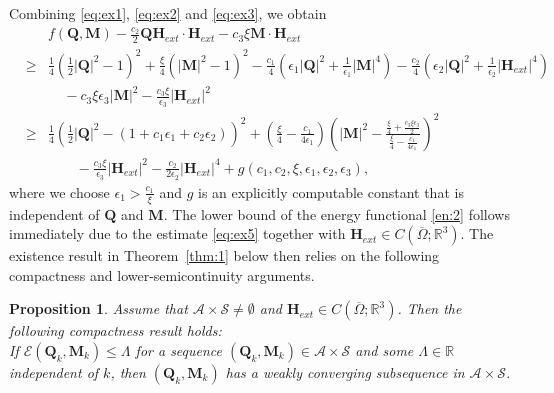 \documentclass{article}
\newtheorem{proposition}[theorem]{Proposition}
\def\Qvec{\mathbf{Q}}
\def \Mvec{\mathbf{M}}
\def\Hvec{\mathbf{H}}
\begin{document}
Combining \eqref{eq:ex1}, \eqref{eq:ex2} and \eqref{eq:ex3}, we obtain 
\begin{eqnarray}
& &f\left(\Qvec, \Mvec\right)-\frac{c_2}{2}\Qvec\Hvec_{ext}\cdot\Hvec_{ext}-c_3\xi\Mvec\cdot\Hvec_{ext}\nonumber\\
&\ge& \frac{1}{4}\left(\frac{1}{2}|\Qvec|^2 - 1\right)^2 + \frac{\xi}{4}\left(|\Mvec|^2 - 1\right)^2 -\frac{c_1}{4}\left(\epsilon_1|\Qvec|^2 + \frac{1}{\epsilon_1}|\Mvec|^4\right) -\frac{c_2}{4}\left(\epsilon_2|\Qvec|^2 + \frac{1}{\epsilon_2}|\Hvec_{ext}|^4\right)\nonumber\\
& &~~~~~-c_3\xi \epsilon_3|\Mvec|^2 -\frac{c_3\xi}{\epsilon_3}|\Hvec_{ext}|^2\nonumber\\
&\ge&\frac{1}{4}\left(\frac{1}{2}|\Qvec|^2-\left(1+c_1\epsilon_1+c_2\epsilon_2\right)\right)^2+\left(\frac{\xi}{4}-\frac{c_1}{4\epsilon_1}\right)\left(|\Mvec|^2 -\frac{\frac{\xi}{4}+\frac{c_3\xi\epsilon_3}{2}}{\frac{\xi}{4}-\frac{c_1}{4\epsilon_1}}\right)^2\nonumber\\
& &~~~~~~~~~-\frac{c_3\xi}{\epsilon_3}|\Hvec_{ext}|^2-\frac{c_2}{2\epsilon_2}|\Hvec_{ext}|^4+g\left(c_1,c_2,\xi,\epsilon_1,\epsilon_2,\epsilon_3\right),\label{eq:ex5}
\end{eqnarray}
where we choose $\epsilon_1>\frac{c_1}{\xi}$ and $g$ is an explicitly computable constant that is independent of $\Qvec$ and $\Mvec$. The lower bound of the energy functional \eqref{en:2} follows immediately due to the estimate \eqref{eq:ex5} together with $\Hvec_{ext}\in C\left(\overline{\Omega}; \mathbb R^3\right)$. 
The existence result in Theorem~\ref{thm:1} below then relies on the following compactness and lower-semicontinuity arguments.
\begin{proposition}\label{prop:1}
Assume that  $\mathcal{A}\times\mathcal{S}\ne\emptyset$ and $\Hvec_{ext}\in C\left(\overline{\Omega}; \mathbb R^3\right)$. Then the following compactness result holds:\\
If $\mathcal{E}\left(\Qvec_k, \Mvec_k\right)\le\Lambda$ for a sequence $\left(\Qvec_k, \Mvec_k\right)\in\mathcal{A}\times\mathcal{S}$ and some $\Lambda\in\mathbb R$ independent of $k$, then $\left(\Qvec_k, \Mvec_k\right)$ has a weakly converging subsequence in $\mathcal{A}\times\mathcal{S}$.
\end{proposition}
\end{document}
